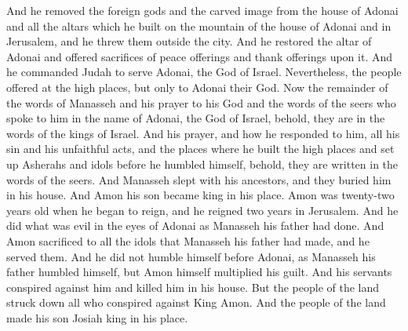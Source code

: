 \begin{biblechapter}
\verse And he removed the foreign gods and the carved image from the house of Adonai and all the altars which he built on the mountain of the house of Adonai and in Jerusalem, and he threw them outside the city.
\verse And he restored the altar of Adonai and offered sacrifices of peace offerings and thank offerings upon it. And he commanded Judah to serve Adonai, the God of Israel.
\verse Nevertheless, the people offered at the high places, but only to Adonai their God.
\verse Now the remainder of the words of Manasseh and his prayer to his God and the words of the seers who spoke to him in the name of Adonai, the God of Israel, behold, they are in the words of the kings of Israel.
\verse And his prayer, and how he responded to him, all his sin and his unfaithful acts, and the places where he built the high places and set up Asherahs and idols before he humbled himself, behold, they are written in the words of the seers.
 And Manasseh slept with his ancestors, and they buried him in his house. And Amon his son became king in his place.
\verse Amon was twenty-two years old when he began to reign, and he reigned two years in Jerusalem.
\verse And he did what was evil in the eyes of Adonai as Manasseh his father had done. And Amon sacrificed to all the idols that Manasseh his father had made, and he served them.
\verse And he did not humble himself before Adonai, as Manasseh his father humbled himself, but Amon himself multiplied his guilt.
\verse And his servants conspired against him and killed him in his house.
\verse But the people of the land struck down all who conspired against King Amon. And the people of the land made his son Josiah king in his place.
\end{biblechapter}

